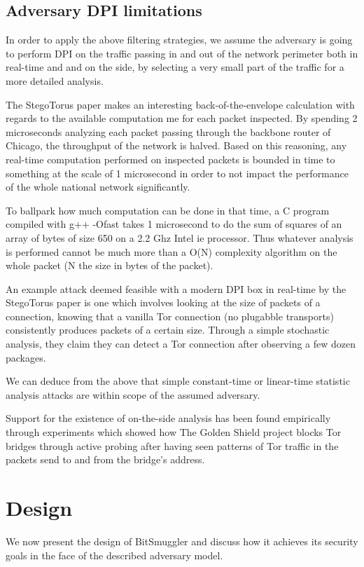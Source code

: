 \documentclass[11pt]{article} %
\newcommand{\projectName}{BitSmuggler }
\begin{document}
\subsection{Adversary DPI limitations}
\label{subsec:dpiLimitations}

In order to apply the above filtering strategies, we assume the adversary is going to perform DPI on the traffic passing in and out of the network perimeter both in real-time and and on the side, by selecting a very small part of the traffic for a more detailed analysis.

The StegoTorus paper \citep*{stegotorus} makes an interesting back-of-the-envelope calculation with regards to the available computation me for each packet inspected. By spending 2 microseconds analyzing each packet passing through the backbone router of Chicago, the throughput of the network is halved. Based on this reasoning, any real-time computation performed on inspected packets is bounded in time to something at the scale of 1 microsecond in order to not impact the performance of the whole national network significantly.

To ballpark how much computation can be done in that time, a C program compiled with g++  -Ofast takes 1 microsecond to do the sum of squares of an array of bytes of size 650 on a 2.2 Ghz Intel ie processor. Thus whatever analysis is performed cannot be much more than a O(N) complexity algorithm on the whole packet (N the size in bytes of the packet).

An example attack deemed feasible with a modern DPI box in real-time by the StegoTorus paper is one which involves looking at the size of packets of a connection, knowing that a vanilla Tor connection (no plugabble transports) consistently produces packets of a certain size. Through a simple stochastic analysis, they claim they can detect a Tor connection after observing a few dozen packages.

We can deduce from the above that simple constant-time  or linear-time statistic analysis attacks are within scope of the assumed adversary.

Support for the existence of on-the-side analysis has been found empirically through experiments which showed how The Golden Shield project blocks Tor bridges through active probing after having seen patterns of Tor traffic in the packets send to and from the bridge's address.

\section{Design}
We now present the design of  \projectName and discuss how it achieves its security goals in the face of the described adversary model.
\end{document}
